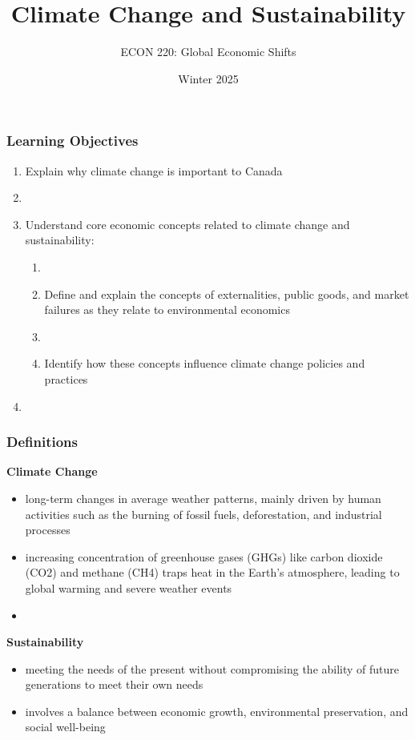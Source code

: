 \documentclass[blue]{beamer}
\title{Climate Change and Sustainability}
\subtitle{ }
\author[Karimzada]{ECON 220: Global Economic Shifts}
\date[ ]{Winter 2025}
\begin{document}
\frame{\titlepage}
\label{Learning Objectives}
\begin{frame} \frametitle{Learning Objectives}

 		 	\begin{enumerate}
 	\item Explain why climate change is important to Canada
 	\item []
 		\item 	Understand core economic concepts related to climate change and sustainability:
 		
 		\begin{enumerate}[a]
 		 \item []
 		\item Define and explain the concepts of externalities, public goods, and market failures as they relate to environmental economics
 		  \item []
 		 \item 
Identify how these concepts influence climate change policies and practices
 		\end{enumerate}
 		   \item []
 	
	   
 		   
         \end{enumerate}
        
\end{frame}



\begin{frame} \frametitle{Definitions}
\label{Definitions}

\textbf{Climate Change}
\begin{itemize}
\item long-term changes in average weather patterns, mainly driven by human activities such as the burning of fossil fuels, deforestation, and industrial processes

\item increasing concentration of greenhouse gases (GHGs) like carbon dioxide (CO2) and methane (CH4) traps heat in the Earth's atmosphere, leading to global warming and severe weather events
\item[]
 \end{itemize}
 
\textbf{ Sustainability}
\begin{itemize}
\item meeting the needs of the present without compromising the ability of future generations to meet their own needs

\item involves a balance between economic growth, environmental preservation, and social well-being
\end{itemize}
 \end{frame}
\end{document}
